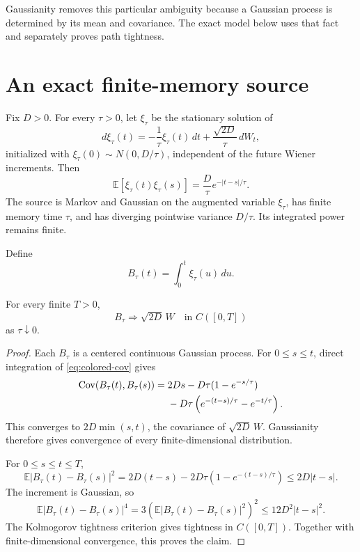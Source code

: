 \documentclass[11pt]{article}
\newcommand{\E}{\mathbb{E}}
\newcommand{\Cov}{\operatorname{Cov}}
\begin{document}
Gaussianity removes this particular ambiguity because a Gaussian process is
determined by its mean and covariance. The exact model below uses that fact
and separately proves path tightness.

\section{An exact finite-memory source}

Fix \(D>0\). For every \(\tau>0\), let \(\xi_\tau\) be the stationary
solution of
\begin{equation}
d\xi_\tau(t)
=-\frac{1}{\tau}\xi_\tau(t)\,dt
+\frac{\sqrt{2D}}{\tau}\,dW_t,
\label{eq:colored-ou}
\end{equation}
initialized with
\(\xi_\tau(0)\sim N(0,D/\tau)\), independent of the future Wiener
increments. Then
\begin{equation}
\E[\xi_\tau(t)\xi_\tau(s)]
=\frac{D}{\tau}e^{-|t-s|/\tau}.
\label{eq:colored-cov}
\end{equation}
The source is Markov and Gaussian on the augmented variable
\(\xi_\tau\), has finite memory time \(\tau\), and has diverging pointwise
variance \(D/\tau\). Its integrated power remains finite.

Define
\[
B_\tau(t)=\int_0^t\xi_\tau(u)\,du.
\]

\begin{theorem}
\label{thm:functional}
For every finite \(T>0\),
\[
B_\tau\Rightarrow\sqrt{2D}\,W
\quad\text{in }C([0,T])
\]
as \(\tau\downarrow0\).
\end{theorem}

\begin{proof}
Each \(B_\tau\) is a centered continuous Gaussian process. For
\(0\leq s\leq t\), direct integration of
\eqref{eq:colored-cov} gives
\begin{align}
\Cov(B_\tau(t),B_\tau(s))
={}&2Ds
-D\tau(1-e^{-s/\tau})\notag\\
&-D\tau
\left(e^{-(t-s)/\tau}-e^{-t/\tau}\right).
\label{eq:integrated-cov}
\end{align}
This converges to \(2D\min(s,t)\), the covariance of
\(\sqrt{2D}\,W\). Gaussianity therefore gives convergence of every
finite-dimensional distribution.

For \(0\leq s\leq t\leq T\),
\[
\E|B_\tau(t)-B_\tau(s)|^2
=2D(t-s)-2D\tau(1-e^{-(t-s)/\tau})
\leq2D|t-s|.
\]
The increment is Gaussian, so
\[
\E|B_\tau(t)-B_\tau(s)|^4
=3\left(\E|B_\tau(t)-B_\tau(s)|^2\right)^2
\leq12D^2|t-s|^2.
\]
The Kolmogorov tightness criterion gives tightness in \(C([0,T])\).
Together with finite-dimensional convergence, this proves the claim.
\end{proof}
\end{document}
